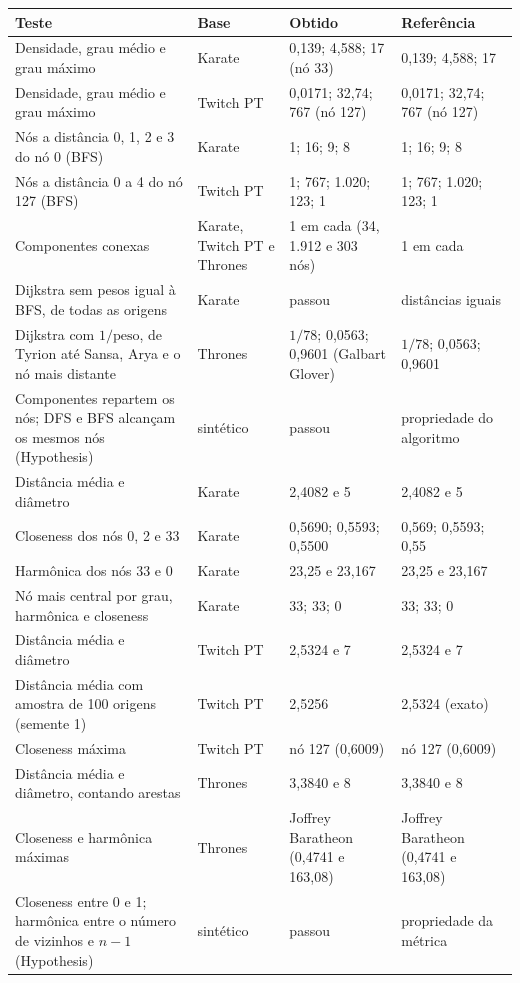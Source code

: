{\small\begin{tabularx}{\linewidth}{@{}Y L{2.5cm} L{2.2cm} L{3.8cm}@{}}
\toprule
Teste & Base & Obtido & Referência \\
\midrule
Densidade, grau médio e grau máximo & Karate & 0,139; 4,588; 17 (nó 33) & 0,139; 4,588; 17 \\
Densidade, grau médio e grau máximo & Twitch PT & 0,0171; 32,74; 767 (nó 127) & 0,0171; 32,74; 767 (nó 127) \\
Nós a distância 0, 1, 2 e 3 do nó 0 (BFS) & Karate & 1; 16; 9; 8 & 1; 16; 9; 8 \\
Nós a distância 0 a 4 do nó 127 (BFS) & Twitch PT & 1; 767; 1.020; 123; 1 & 1; 767; 1.020; 123; 1 \\
Componentes conexas & Karate, Twitch PT e Thrones & 1 em cada (34, 1.912 e 303 nós) & 1 em cada \\
Dijkstra sem pesos igual à BFS, de todas as origens & Karate & passou & distâncias iguais \\
Dijkstra com $1/\text{peso}$, de Tyrion até Sansa, Arya e o nó mais distante & Thrones & $1/78$; 0,0563; 0,9601 (Galbart Glover) & $1/78$; 0,0563; 0,9601 \\
Componentes repartem os nós; DFS e BFS alcançam os mesmos nós (Hypothesis) & sintético & passou & propriedade do algoritmo \\
Distância média e diâmetro & Karate & 2,4082 e 5 & 2,4082 e 5 \\
Closeness dos nós 0, 2 e 33 & Karate & 0,5690; 0,5593; 0,5500 & 0,569; 0,5593; 0,55 \\
Harmônica dos nós 33 e 0 & Karate & 23,25 e 23,167 & 23,25 e 23,167 \\
Nó mais central por grau, harmônica e closeness & Karate & 33; 33; 0 & 33; 33; 0 \\
Distância média e diâmetro & Twitch PT & 2,5324 e 7 & 2,5324 e 7 \\
Distância média com amostra de 100 origens (semente 1) & Twitch PT & 2,5256 & 2,5324 (exato) \\
Closeness máxima & Twitch PT & nó 127 (0,6009) & nó 127 (0,6009) \\
Distância média e diâmetro, contando arestas & Thrones & 3,3840 e 8 & 3,3840 e 8 \\
Closeness e harmônica máximas & Thrones & Joffrey Baratheon (0,4741 e 163,08) & Joffrey Baratheon (0,4741 e 163,08) \\
Closeness entre 0 e 1; harmônica entre o número de vizinhos e $n-1$ (Hypothesis) & sintético & passou & propriedade da métrica \\
\bottomrule
\end{tabularx}}

